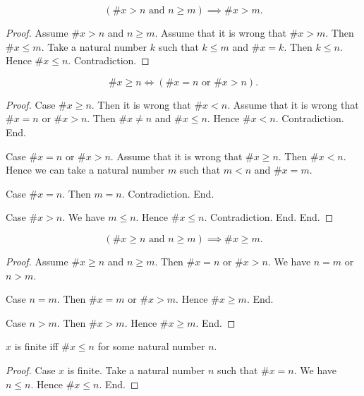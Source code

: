\documentclass[../../set-theory.tex]{subfiles}
\begin{document}
\begin{forthel}
    \begin{proposition}
      \[ (\text{$\# x > n$ and $n \geq m$}) \implies \# x > m. \]
    \end{proposition}
    \begin{proof}
      Assume $\# x > n$ and $n \geq m$.
      Assume that it is wrong that $\# x > m$.
      Then $\# x \leq m$.
      Take a natural number $k$ such that $k \leq m$ and $\# x = k$.
      Then $k \leq n$.
      Hence $\# x \leq n$.
      Contradiction.
    \end{proof}

    \begin{proposition}
      \[ \# x \geq n \iff (\text{$\# x = n$ or $\# x > n$}). \]
    \end{proposition}
    \begin{proof}
      Case $\# x \geq n$.
        Then it is wrong that $\# x < n$.
        Assume that it is wrong that $\# x = n$ or $\# x > n$.
        Then $\# x \neq n$ and $\# x \leq n$.
        Hence $\# x < n$.
        Contradiction.
      End.

      Case $\# x = n$ or $\# x > n$.
        Assume that it is wrong that $\# x \geq n$.
        Then $\# x < n$.
        Hence we can take a natural number $m$ such that $m < n$ and $\# x = m$.

        Case $\# x = n$.
          Then $m = n$.
          Contradiction.
        End.

        Case $\# x > n$.
          We have $m \leq n$.
          Hence $\# x \leq n$.
          Contradiction.
        End.
      End.
    \end{proof}

    \begin{proposition}
      \[ (\text{$\# x \geq n$ and $n \geq m$}) \implies \# x \geq m. \]
    \end{proposition}
    \begin{proof}
      Assume $\# x \geq n$ and $n \geq m$.
      Then $\# x = n$ or $\# x > n$.
      We have $n = m$ or $n > m$.

      Case $n = m$.
        Then $\# x = m$ or $\# x > m$.
        Hence $\# x \geq m$.
      End.

      Case $n > m$.
        Then $\# x > m$.
        Hence $\# x \geq m$.
      End.
    \end{proof}

    \begin{proposition}
      $x$ is finite iff $\# x \leq n$ for some natural number $n$.
    \end{proposition}
    \begin{proof}
      Case $x$ is finite.
        Take a natural number $n$ such that $\# x = n$.
        We have $n \leq n$.
        Hence $\# x \leq n$.
      End.


\end{proof}
\end{forthel}
\end{document}
